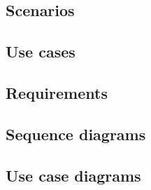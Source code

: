 \subsection{Scenarios}


\subsection{Use cases} \label{use_cases}


\subsection{Requirements}


\newpage
\subsection{Sequence diagrams}


\subsection{Use case diagrams}

